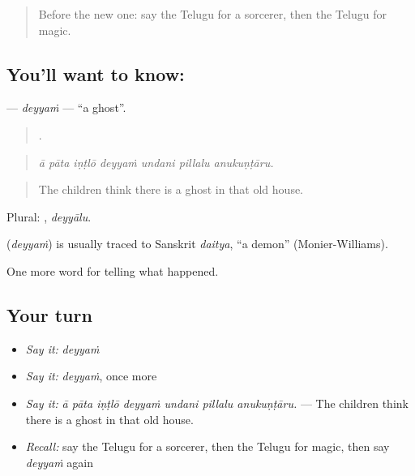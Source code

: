 \label{lesson:TE-C371-deyyam}



\begin{quote}
Before the new one: say the Telugu for a sorcerer, then the Telugu for magic.
\end{quote}

\subsection*{You'll want to know: }
\textbf{} — \emph{deyyaṁ} — \textquotedblleft{}a ghost\textquotedblright{}.

\begin{quote}
      .
\end{quote}

\begin{quote}
\emph{ā pāta iṇṭlō deyyaṁ undani pillalu anukuṇṭāru.}
\end{quote}

\begin{quote}
The children think there is a ghost in that old house.
\end{quote}

Plural: , \emph{deyyālu}.

\begin{cousinweb}
\textbf{} (\emph{deyyaṁ}) is usually traced to Sanskrit \emph{daitya}, \textquotedblleft{}a demon\textquotedblright{} (Monier-Williams).
\end{cousinweb}

\begin{grammarlens}[title={What you've built}]
One more word for telling what happened.
\end{grammarlens}

\subsection*{Your turn}
\begin{itemize}
\raggedright
  \item \emph{Say it:} \emph{deyyaṁ}
  \item \emph{Say it:} \emph{deyyaṁ}, once more
  \item \emph{Say it:} \emph{ā pāta iṇṭlō deyyaṁ undani pillalu anukuṇṭāru.} — The children think there is a ghost in that old house.
  \item \emph{Recall:} say the Telugu for a sorcerer, then the Telugu for magic, then say \emph{deyyaṁ} again
\end{itemize}

